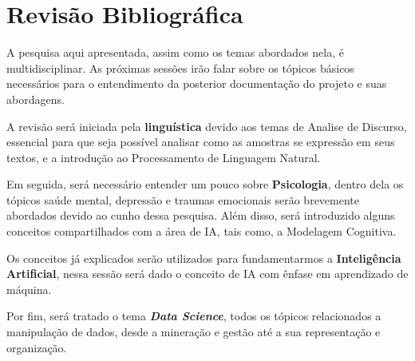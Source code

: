 % 
\chapter{Revisão Bibliográfica}
A pesquisa aqui apresentada, assim como os temas abordados nela, é multidisciplinar. As próximas sessões irão falar sobre os tópicos básicos necessários para o entendimento da posterior documentação do projeto e suas abordagens.

A revisão será iniciada pela \textbf{linguística} devido aos temas de Analise de Discurso, essencial para que seja possível analisar como as amostras se expressão em seus textos, e a introdução ao Processamento de Linguagem Natural.

Em seguida, será necessário entender um pouco sobre \textbf{Psicologia}, dentro dela os tópicos saúde mental, depressão e traumas emocionais serão brevemente abordados devido ao cunho dessa pesquisa. Além disso, será introduzido alguns conceitos compartilhados com a área de IA, tais como, a Modelagem Cognitiva.

Os conceitos já explicados serão utilizados para fundamentarmos a \textbf{Inteligência Artificial}, nessa sessão será dado o conceito de IA com ênfase em aprendizado de máquina.

Por fim, será tratado o tema \textit{\textbf{Data Science}}, todos os tópicos relacionados a manipulação de dados, desde a mineração e gestão até a sua representação e organização.






